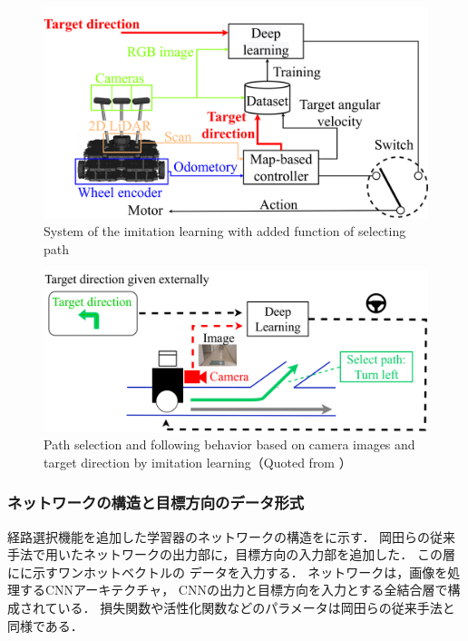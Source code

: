 \begin{figure}[htbp]
    \centering
     \includegraphics[width=130mm]{images/pdf/haru_mech_sys.pdf}
     \caption{System of the imitation learning with added function of
     selecting path}
     \label{fig:haru_mech_sys}
\end{figure}
\begin{figure}[htbp]
    \centering
     \includegraphics[width=130mm]{images/pdf/learning_gamma.pdf}
     \caption[Path selection and following behavior based on camera images 
     and target direction by imitation learning]{Path selection and following behavior based on camera images 
     and target direction by imitation learning（Quoted from \cite{haruyama2023}）}
     \label{fig:path_select_abs}
\end{figure}

\clearpage
\subsubsection{ネットワークの構造と目標方向のデータ形式}
経路選択機能を追加した学習器のネットワークの構造をに示す．
岡田らの従来手法で用いたネットワークの出力部に，目標方向の入力部を追加した．
この層にに示すワンホットベクトルの
データを入力する．
ネットワークは，画像を処理するCNNアーキテクチャ，
CNNの出力と目標方向を入力とする全結合層で構成されている．
損失関数や活性化関数などのパラメータは岡田らの従来手法と同様である．


